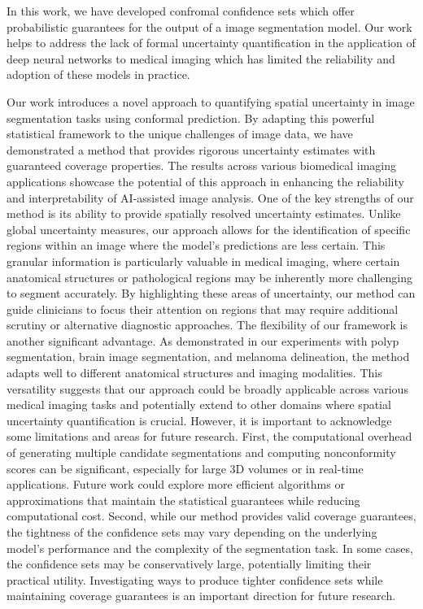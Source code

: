 In this work, we have developed confromal confidence sets which offer probabilistic guarantees for the output of a image segmentation model. Our work helps to address the lack of formal uncertainty quantification in the application of deep neural networks to medical imaging which has limited the reliability and adoption of these models in practice.




Our work introduces a novel approach to quantifying spatial uncertainty in image segmentation tasks using conformal prediction. By adapting this powerful statistical framework to the unique challenges of image data, we have demonstrated a method that provides rigorous uncertainty estimates with guaranteed coverage properties. The results across various biomedical imaging applications showcase the potential of this approach in enhancing the reliability and interpretability of AI-assisted image analysis.
One of the key strengths of our method is its ability to provide spatially resolved uncertainty estimates. Unlike global uncertainty measures, our approach allows for the identification of specific regions within an image where the model's predictions are less certain. This granular information is particularly valuable in medical imaging, where certain anatomical structures or pathological regions may be inherently more challenging to segment accurately. By highlighting these areas of uncertainty, our method can guide clinicians to focus their attention on regions that may require additional scrutiny or alternative diagnostic approaches.
The flexibility of our framework is another significant advantage. As demonstrated in our experiments with polyp segmentation, brain image segmentation, and melanoma delineation, the method adapts well to different anatomical structures and imaging modalities. This versatility suggests that our approach could be broadly applicable across various medical imaging tasks and potentially extend to other domains where spatial uncertainty quantification is crucial.
However, it is important to acknowledge some limitations and areas for future research. First, the computational overhead of generating multiple candidate segmentations and computing nonconformity scores can be significant, especially for large 3D volumes or in real-time applications. Future work could explore more efficient algorithms or approximations that maintain the statistical guarantees while reducing computational cost.
Second, while our method provides valid coverage guarantees, the tightness of the confidence sets may vary depending on the underlying model's performance and the complexity of the segmentation task. In some cases, the confidence sets may be conservatively large, potentially limiting their practical utility. Investigating ways to produce tighter confidence sets while maintaining coverage guarantees is an important direction for future research.

